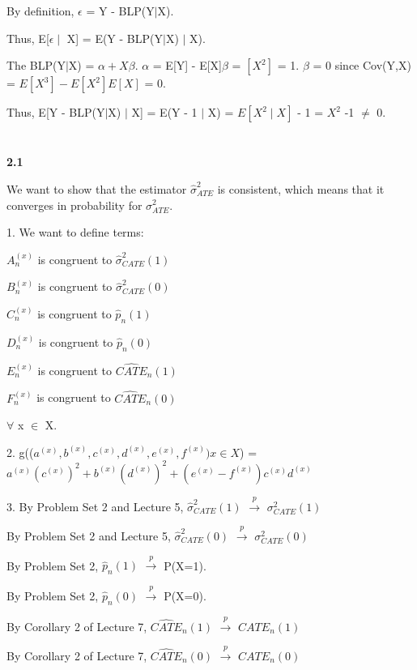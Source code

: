 \documentclass{article}
\begin{document}
By definition, $\epsilon$ = Y - BLP(Y$\mid$X).

Thus, E[$\epsilon \mid$ X] = E(Y - BLP(Y$\mid$X) $\mid$ X).

The BLP(Y$\mid$X) = $\alpha + X\beta$. $\alpha$ = E[Y] - E[X]$\beta$ = $[X^{2}]$ = 1. $\beta$ = 0 since Cov(Y,X) = $E[X^{3}] - E[X^{2}]E[X]$ = 0.

Thus, E[Y - BLP(Y$\mid$X) $\mid$ X] = E(Y - 1 $\mid$ X) = $E[X^{2} \mid X]$ - 1 = $X^{2}$ -1 $\neq$ 0.

\section{}

\textbf{2.1}

We want to show that the estimator $\hat{\sigma}^{2}_{ATE}$ is consistent, which means that it converges in probability for $\sigma^{2}_{ATE}$.

1. We want to define terms:

$A_{n}^{(x)}$ is congruent to $\hat{\sigma}^{2}_{CATE} (1)$

$B_{n}^{(x)}$ is congruent to $\hat{\sigma}^{2}_{CATE} (0)$

$C_{n}^{(x)}$ is congruent to $\hat{p}_{n} (1)$

$D_{n}^{(x)}$ is congruent to $\hat{p}_{n} (0)$

$E_{n}^{(x)}$ is congruent to $\widehat{CATE}_{n} (1)$

$F_{n}^{(x)}$ is congruent to $\widehat{CATE}_{n} (0)$

$\forall$ x $\in$ X.

2. g(($a^{(x)},b^{(x)},c^{(x)},d^{(x)},e^{(x)},f^{(x)}) x \in X$) = $a^{(x)} (c^{(x)})^{2} + b^{(x)} (d^{(x)})^{2} + (e^{(x)} - f^{(x)}) c^{(x)} d^{(x)}$

3. By Problem Set 2 and Lecture 5,  $\hat{\sigma}^{2}_{CATE} (1)$ $\xrightarrow{p}$ ${\sigma}^{2}_{CATE} (1)$

By Problem Set 2 and Lecture 5,  $\hat{\sigma}^{2}_{CATE} (0)$ $\xrightarrow{p}$ ${\sigma}^{2}_{CATE} (0)$

By Problem Set 2, $\hat{p}_{n} (1)$ $\xrightarrow{p}$ P(X=1).

By Problem Set 2, $\hat{p}_{n} (0)$ $\xrightarrow{p}$ P(X=0).

By Corollary 2 of Lecture 7, $\widehat{CATE}_{n} (1)$ $\xrightarrow{p}$ ${CATE}_{n} (1)$

By Corollary 2 of Lecture 7, $\widehat{CATE}_{n} (0)$ $\xrightarrow{p}$ ${CATE}_{n} (0)$
\end{document}
